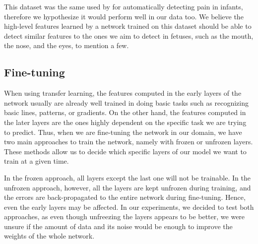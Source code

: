 This dataset was the same used by \cite{abs-1807-01631} for automatically detecting pain in infants, therefore we hypothesize it would perform well in our data too. We believe the high-level features learned by a network trained on this dataset should be able to detect similar features to the ones we aim to detect in fetuses, such as the mouth, the nose, and the eyes, to mention a few.

\subsection{Fine-tuning}

When using transfer learning, the features computed in the early layers of the network usually are already well trained in doing basic tasks such as recognizing basic lines, patterns, or gradients. On the other hand, the features computed in the later layers are the ones highly dependent on the specific task we are trying to predict. Thus, when we are fine-tuning the network in our domain, we have two main approaches to train the network, namely with frozen or unfrozen layers. These methods allow us to decide which specific layers of our model we want to train at a given time. 

In the frozen approach, all layers except the last one will not be trainable. In the unfrozen approach, however, all the layers are kept unfrozen during training, and the errors are back-propagated to the entire network during fine-tuning. Hence, even the early layers may be affected. In our experiments, we decided to test both approaches, as even though unfreezing the layers appears to be better, we were unsure if the amount of data and its noise would be enough to improve the weights of the whole network.




